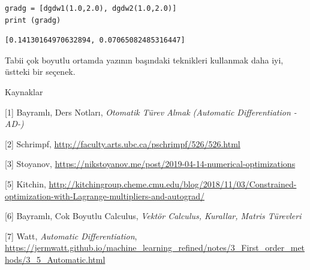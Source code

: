 \documentclass[12pt,fleqn]{article}\usepackage{../../common}
\begin{document}
\begin{verbatim}
gradg = [dgdw1(1.0,2.0), dgdw2(1.0,2.0)]
print (gradg)
\end{verbatim}

\begin{verbatim}
[0.14130164970632894, 0.07065082485316447]
\end{verbatim}

Tabii çok boyutlu ortamda yazının başındaki teknikleri kullanmak daha iyi,
üstteki bir seçenek.

Kaynaklar 

[1] Bayramlı, Ders Notları, {\em Otomatik Türev Almak (Automatic Differentiation -AD-)}

[2] Schrimpf, \url{http://faculty.arts.ubc.ca/pschrimpf/526/526.html}

[3] Stoyanov, \url{https://nikstoyanov.me/post/2019-04-14-numerical-optimizations}

[5] Kitchin, \url{http://kitchingroup.cheme.cmu.edu/blog/2018/11/03/Constrained-optimization-with-Lagrange-multipliers-and-autograd/}

[6] Bayramlı, Cok Boyutlu Calculus, {\em Vektör Calculus, Kurallar, Matris Türevleri}

[7] Watt, {\em Automatic Differentiation}, 
    \url{https://jermwatt.github.io/machine_learning_refined/notes/3_First_order_methods/3_5_Automatic.html}


    
\end{document}
